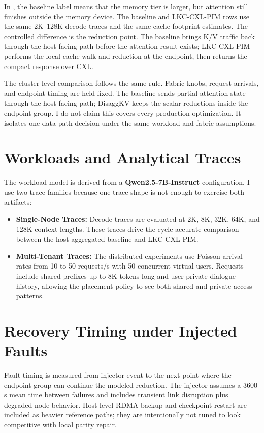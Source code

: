 In , the baseline label means that the memory tier is larger, but attention still finishes outside the memory device. The baseline and LKC-CXL-PIM rows use the same 2K--128K decode traces and the same cache-footprint estimates. The controlled difference is the reduction point. The baseline brings K/V traffic back through the host-facing path before the attention result exists; LKC-CXL-PIM performs the local cache walk and reduction at the endpoint, then returns the compact response over CXL.

The cluster-level comparison follows the same rule. Fabric knobs, request arrivals, and endpoint timing are held fixed. The baseline sends partial attention state through the host-facing path; DisaggKV keeps the scalar reductions inside the endpoint group. I do not claim this covers every production optimization. It isolates one data-path decision under the same workload and fabric assumptions.

\section{Workloads and Analytical Traces}

The workload model is derived from a \textbf{Qwen2.5-7B-Instruct} configuration. I use two trace families because one trace shape is not enough to exercise both artifacts:
\begin{itemize}
    \item \textbf{Single-Node Traces:} Decode traces are evaluated at 2K, 8K, 32K, 64K, and 128K context lengths. These traces drive the cycle-accurate comparison between the host-aggregated baseline and LKC-CXL-PIM.
    \item \textbf{Multi-Tenant Traces:} The distributed experiments use Poisson arrival rates from 10 to 50 requests/s with 50 concurrent virtual users. Requests include shared prefixes up to 8K tokens long and user-private dialogue history, allowing the placement policy to see both shared and private access patterns.
\end{itemize}

\section{Recovery Timing under Injected Faults}

Fault timing is measured from injector event to the next point where the endpoint group can continue the modeled reduction. The injector assumes a 3600\,s mean time between failures and includes transient link disruption plus degraded-node behavior. Host-level RDMA backup and checkpoint-restart are included as heavier reference paths; they are intentionally not tuned to look competitive with local parity repair.


